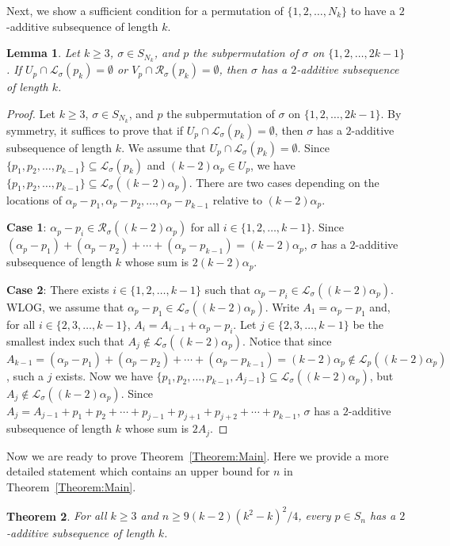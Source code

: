 \documentclass[11pt]{article}
\newtheorem{theorem}{Theorem}[section]
\newtheorem{lemma}[theorem]{Lemma}
\theoremstyle{definition}
\begin{document}
Next, we show a sufficient condition for a permutation of $\{1,2,\ldots,N_k\}$ to have a $2$-additive subsequence of length $k$.    
\begin{lemma}\label{Lemma:NonEmptyIntersection}
    Let $k\geq3$, $\sigma\in S_{N_k}$, and $p$ the subpermutation of $\sigma$ on $\{1,2,\ldots,2k-1\}$. If $U_p\cap\mathcal{L}_\sigma(p_k)=\emptyset$ or $V_p\cap\mathcal{R}_\sigma(p_k)=\emptyset$, then $\sigma$ has a $2$-additive subsequence of length $k$.
\end{lemma}
\begin{proof}
    Let $k\geq3$, $\sigma\in S_{N_k}$, and $p$ the subpermutation of $\sigma$ on $\{1,2,\ldots,2k-1\}$. By symmetry, it suffices to prove that if $U_p\cap\mathcal{L}_\sigma(p_k)=\emptyset$, then $\sigma$ has a $2$-additive subsequence of length $k$. We assume that $U_p\cap\mathcal{L}_\sigma(p_k)=\emptyset$. Since $\{p_1,p_2,\ldots,p_{k-1}\}\subseteq\mathcal{L}_\sigma(p_k)$ and $(k-2)\alpha_p\in U_p$, we have $\{p_1,p_2,\ldots,p_{k-1}\}\subseteq\mathcal{L}_\sigma((k-2)\alpha_p)$. There are two cases depending on the locations of $\alpha_p-p_1,\alpha_p-p_2,\ldots,\alpha_p-p_{k-1}$ relative to $(k-2)\alpha_p$.

    {\bf Case 1}: $\alpha_p-p_i\in\mathcal{R}_\sigma((k-2)\alpha_p)$ for all $i\in\{1,2,\ldots,k-1\}$. Since $(\alpha_p-p_1)+(\alpha_p-p_2)+\cdots+(\alpha_p-p_{k-1})=(k-2)\alpha_p$, $\sigma$ has a $2$-additive subsequence of length $k$ whose sum is $2(k-2)\alpha_p$.

    {\bf Case 2}: There exists $i\in\{1,2,\ldots,k-1\}$ such that $\alpha_p-p_i\in\mathcal{L}_\sigma((k-2)\alpha_p)$. WLOG, we assume that $\alpha_p-p_1\in\mathcal{L}_\sigma((k-2)\alpha_p)$. Write $A_1=\alpha_p-p_1$ and, for all $i\in\{2,3,\ldots,k-1\}$, $A_i=A_{i-1}+\alpha_p-p_i$. Let $j\in\{2,3,\ldots,k-1\}$ be the smallest index such that $A_j\notin\mathcal{L}_\sigma((k-2)\alpha_p)$. Notice that since $A_{k-1}=(\alpha_p-p_1)+(\alpha_p-p_2)+\cdots+(\alpha_p-p_{k-1})=(k-2)\alpha_p\notin\mathcal{L}_p((k-2)\alpha_p)$, such a $j$ exists. Now we have $\{p_1,p_2,\ldots,p_{k-1},A_{j-1}\}\subseteq\mathcal{L}_\sigma((k-2)\alpha_p)$, but $A_j\notin\mathcal{L}_\sigma((k-2)\alpha_p)$. Since $A_j=A_{j-1}+p_1+p_2+\cdots+p_{j-1}+p_{j+1}+p_{j+2}+\cdots+p_{k-1}$, $\sigma$ has a $2$-additive subsequence of length $k$ whose sum is $2A_j$.
\end{proof}

Now we are ready to prove Theorem~\ref{Theorem:Main}. Here we provide a more detailed statement which contains an upper bound for $n$ in Theorem~\ref{Theorem:Main}.
\begin{theorem}\label{Theorem:Existence:Nonmonotone}
For all $k\geq3$ and $n\geq9(k-2)(k^2-k)^2/4$, every $p\in S_n$ has a $2$-additive subsequence of length $k$.
\end{theorem}
\end{document}
